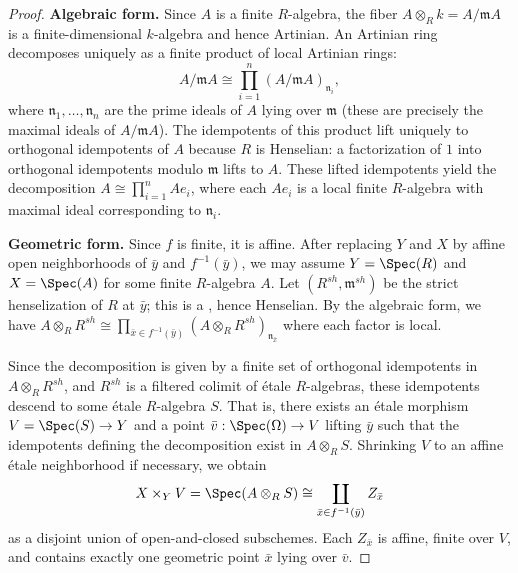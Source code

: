 \begin{proof}
    \textbf{Algebraic form.} Since $A$ is a finite $R$-algebra, the fiber $A \otimes_R k = A/\mathfrak{m}A$ is a finite-dimensional $k$-algebra and hence Artinian. An Artinian ring decomposes uniquely as a finite product of local Artinian rings:
    $$ A/\mathfrak{m}A \cong \prod_{i=1}^n (A/\mathfrak{m}A)_{\mathfrak{n}_i}, $$
    where $\mathfrak{n}_1, \dots, \mathfrak{n}_n$ are the prime ideals of $A$ lying over $\mathfrak{m}$ (these are precisely the maximal ideals of $A/\mathfrak{m}A$). The idempotents of this product lift uniquely to orthogonal idempotents of $A$ because $R$ is Henselian: a factorization of $1$ into orthogonal idempotents modulo $\mathfrak{m}$ lifts to $A$. These lifted idempotents yield the decomposition $A \cong \prod_{i=1}^n A e_i$, where each $A e_i$ is a local finite $R$-algebra with maximal ideal corresponding to $\mathfrak{n}_i$.

    \textbf{Geometric form.} Since $f$ is finite, it is affine. After replacing $Y$ and $X$ by affine open neighborhoods of $\bar{y}$ and $f^{-1}(\bar{y})$, we may assume $Y = \Spec(R)$ and $X = \Spec(A)$ for some finite $R$-algebra $A$. Let $(R^{sh}, \mathfrak{m}^{sh})$ be the strict henselization of $R$ at $\bar{y}$; this is a , hence Henselian. By the algebraic form, we have $A \otimes_R R^{sh} \cong \prod_{\bar{x} \in f^{-1}(\bar{y})} (A \otimes_R R^{sh})_{\mathfrak{n}_{\bar{x}}}$ where each factor is local.

    Since the decomposition is given by a finite set of orthogonal idempotents in $A \otimes_R R^{sh}$, and $R^{sh}$ is a filtered colimit of étale $R$-algebras, these idempotents descend to some étale $R$-algebra $S$. That is, there exists an étale morphism $V = \Spec(S) \to Y$ and a point $\bar{v} : \Spec(\Omega) \to V$ lifting $\bar{y}$ such that the idempotents defining the decomposition exist in $A \otimes_R S$. Shrinking $V$ to an affine étale neighborhood if necessary, we obtain
    $$ X \times_Y V = \Spec(A \otimes_R S) \cong \coprod_{\bar{x} \in f^{-1}(\bar{y})} Z_{\bar{x}} $$
    as a disjoint union of open-and-closed subschemes. Each $Z_{\bar{x}}$ is affine, finite over $V$, and contains exactly one geometric point $\bar{x}$ lying over $\bar{v}$.
\end{proof}
